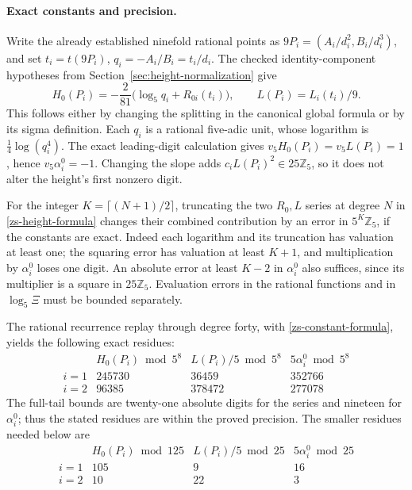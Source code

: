 \paragraph{Exact constants and precision.}
Write the already established ninefold rational points as
\(9P_i=(A_i/d_i^2,B_i/d_i^3)\), and set
\(t_i=t(9P_i)\), \(q_i=-A_i/B_i=t_i/d_i\). The checked
identity-component hypotheses from Section~\ref{sec:height-normalization}
give
\begin{equation}
 H_0(P_i)=-\frac2{81}\bigl(\log_5q_i+R_{0i}(t_i)\bigr),
 \qquad L(P_i)=L_i(t_i)/9.
 \label{zs-constant-formula}
\end{equation}
This follows either by changing the splitting in the canonical global
formula or by its sigma definition. Each \(q_i\) is a rational
five-adic unit, whose logarithm is
\(\frac14\log(q_i^4)\). The exact leading-digit calculation gives
\(v_5H_0(P_i)=v_5L(P_i)=1\), hence \(v_5\alpha_i^0=-1\).
Changing the slope adds \(c_iL(P_i)^2\in25\mathbb Z_5\), so it does
not alter the height's first nonzero digit.

For the integer \(K=\lceil(N+1)/2\rceil\), truncating the two
\(R_0,L\) series at degree \(N\) in \eqref{zs-height-formula}
changes their combined contribution by an error in \(5^K\mathbb Z_5\),
if the constants are exact. Indeed each logarithm and its truncation
has valuation at least one; the squaring error has valuation at least
\(K+1\), and multiplication by \(\alpha_i^0\) loses one digit.
An absolute error at least \(K-2\) in \(\alpha_i^0\) also suffices,
since its multiplier is a square in \(25\mathbb Z_5\).
Evaluation errors in the rational functions and in \(\log_5\Xi\)
must be bounded separately.

The rational recurrence replay through degree forty, with
\eqref{zs-constant-formula}, yields the following exact residues:
\[
\begin{array}{c|rrr}
 &H_0(P_i)\bmod5^8&L(P_i)/5\bmod5^8&5\alpha_i^0\bmod5^8\\\hline
 i=1&245730&36459&352766\\
 i=2&96385&378472&277078
\end{array}
\]
The full-tail bounds are twenty-one absolute digits for the series
and nineteen for \(\alpha_i^0\); thus the stated residues are within
the proved precision. The smaller residues needed below are
\begin{equation}
\begin{array}{c|rrr}
 &H_0(P_i)\bmod125&L(P_i)/5\bmod25&5\alpha_i^0\bmod25\\\hline
 i=1&105&9&16\\
 i=2&10&22&3
\end{array}
 \label{zs-small-constants}
\end{equation}

